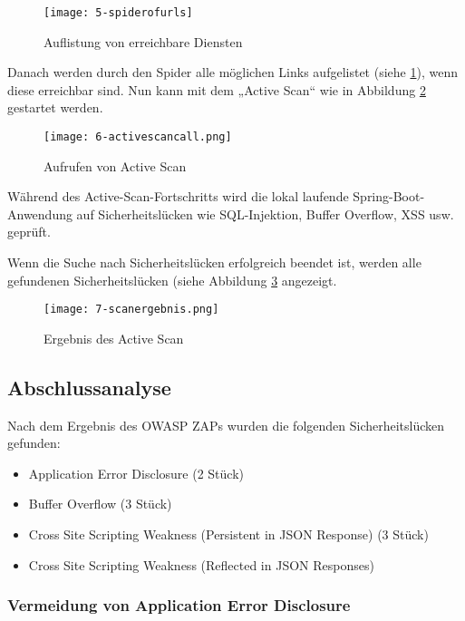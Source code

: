 \begin{figure}[h]
	\centering
	\texttt{[image: 5-spiderofurls]}
	\caption{Auflistung von erreichbare Diensten}
	\label{swaggerimport3}
\end{figure}

Danach werden durch den Spider alle möglichen Links aufgelistet (siehe \ref{swaggerimport3}), wenn diese erreichbar sind. Nun kann mit dem „Active Scan“ wie in Abbildung \ref{swaggerimport4} gestartet werden. 

\begin{figure}[h]
	\centering
	\texttt{[image: 6-activescancall.png]}
	\caption{Aufrufen von Active Scan}
	\label{swaggerimport4}
\end{figure}

Während des Active-Scan-Fortschritts wird die lokal laufende Spring-Boot-Anwendung auf Sicherheitslücken wie SQL-Injektion, Buffer Overflow, XSS usw. geprüft.

\newpage

Wenn die Suche nach Sicherheitslücken erfolgreich beendet ist, werden alle gefundenen Sicherheitslücken (siehe Abbildung \ref{swaggerimport5} angezeigt.

\begin{figure}[h]
	\centering
	\texttt{[image: 7-scanergebnis.png]}
	\caption{Ergebnis des Active Scan}
	\label{swaggerimport5}
\end{figure}

\subsection{Abschlussanalyse}

Nach dem Ergebnis des OWASP ZAPs wurden die folgenden Sicherheitslücken gefunden:

\begin{itemize}
	\item Application Error Disclosure (2 Stück)
	\item Buffer Overflow (3 Stück)
	\item Cross Site Scripting Weakness (Persistent in JSON Response) (3 Stück)
	\item Cross Site Scripting Weakness (Reflected in JSON Responses)
\end{itemize}

\subsubsection{Vermeidung von Application Error Disclosure}

